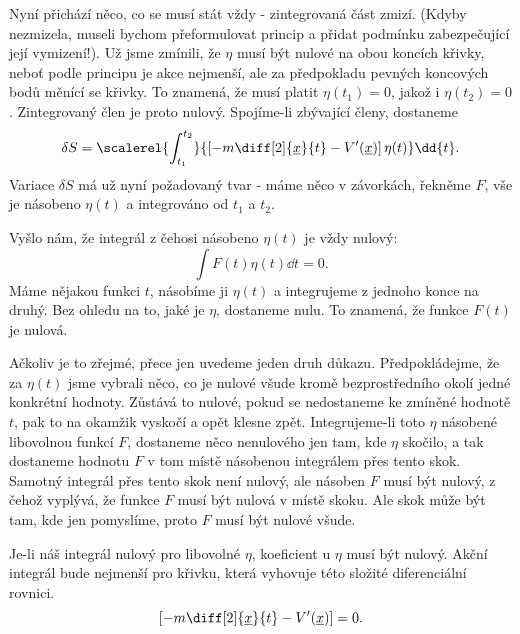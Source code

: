     Nyní přichází něco, co se musí stát vždy - zintegrovaná část zmizí. (Kdyby nezmizela, museli
    bychom přeformulovat princip a přidat podmínku zabezpečující její vymizení!). Už jsme zmínili,
    že \(\eta\) musí být nulové na obou koncích křivky, neboť podle principu je akce nejmenší, ale
    za předpokladu pevných koncových bodů měnící se křivky. To znamená, že musí platit \(\eta(t_1)
    =0\), jakož i \(\eta(t_2) = 0\). Zintegrovaný člen je proto nulový. Spojíme-li zbývající členy,
    dostaneme
    \begin{equation*}
      \delta S = \scalerel{\int^{t_2}_{t_1}}{
        \left[-m\diff[2]{\underline{x}}{t} -V'(\underline{x})\right]\eta(t)
      }\dd{t}.
    \end{equation*} 
    Variace \(\delta S\) má už nyní požadovaný tvar - máme něco v závorkách, řekněme \(F\), vše je
    násobeno \(\eta(t)\) a integrováno od \(t_1\) a \(t_2\).

    Vyšlo nám, že integrál z čehosi násobeno \(\eta(t)\) je vždy nulový:
    \begin{equation*}
      \int F(t)\eta(t)\dd{t} = 0.
    \end{equation*} 
    Máme nějakou funkci \(t\), násobíme ji \(\eta(t)\) a integrujeme z jednoho konce na druhý. Bez
    ohledu na to, jaké je \(\eta\), dostaneme nulu. To znamená, že funkce \(F(t)\) je nulová.
    
    Ačkoliv je to zřejmé, přece jen uvedeme jeden druh důkazu. Předpokládejme, že za \(\eta(t)\)
    jsme vybrali něco, co je nulové všude kromě bezprostředního okolí jedné konkrétní hodnoty.
    Zůstává to nulové, pokud se nedostaneme ke zmíněné hodnotě \(t\), pak to na okamžik vyskočí a
    opět klesne zpět. Integrujeme-li toto \(\eta\) násobené libovolnou funkcí \(F\), dostaneme něco
    nenulového jen tam, kde \(\eta\) skočilo, a tak dostaneme hodnotu \(F\) v tom místě násobenou
    integrálem přes tento skok. Samotný integrál přes tento skok není nulový, ale násoben \(F\) musí
    být nulový, z čehož vyplývá, že funkce \(F\) musí být nulová v místě skoku. Ale skok může být
    tam, kde jen pomyslíme, proto \(F\) musí být nulové všude.  


    Je-li náš integrál nulový pro libovolné \(\eta\), koeficient u \(\eta\) musí být nulový. Akční
    integrál bude nejmenší pro křivku, která vyhovuje této složité diferenciální rovnici. 
    \begin{equation*}
      \left[-m\diff[2]{\underline{x}}{t} -V'(\underline{x})\right] = 0.
    \end{equation*}  
    
